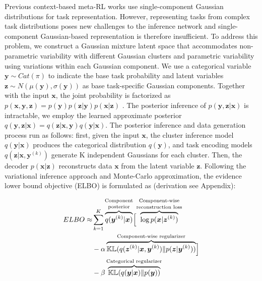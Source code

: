 \documentclass[letterpaper]{article} %
\begin{document}
Previous context-based meta-RL works \cite{PEARL, MELD, VariBAD, asTaskInference} use single-component Gaussian distributions for task representation. However, representing tasks from complex task distributions poses new challenges to the inference network and single-component Gaussian-based representation is therefore insufficient. To address this problem, we construct a Gaussian mixture latent space that accommodates non-parametric variability with different Gaussian clusters and parametric variability using variations within each Gaussian component. We use a categorical variable $\bm y \sim Cat(\pi)$ to indicate the base task probability and latent variables $\bm z \sim N(\mu(\bm y), \sigma(\bm y))$ as base task-specific Gaussian components. Together with the input $\bm x$, the joint probability is factorized as $p(\bm x,\bm y,\bm z) = p(\bm y)p(\bm z|\bm y)p(\bm x|\bm z)$ \cite{VaDE, CURL-Rao}. The posterior inference of $p(\bm y, \bm z|\bm x)$ is intractable, we employ the learned approximate posterior $q(\bm y, \bm z|\bm x)=q(\bm z|\bm x, \bm y)q(\bm y| \bm x)$. The posterior inference and data generation process run as follows: first, given the input $\bm x$, the cluster inference model $q(\bm y|\bm x)$ produces the categorical distribution $q(\bm y)$, and task encoding models $q(\bm z|\bm x, \bm y^{(k)})$ generate K independent Gaussians for each cluster. Then, the decoder $p(\bm x|\bm z)$ reconstructs data $\bm x$ from the latent variable $\bm z$. Following the variational inference approach and Monte-Carlo approximation, the evidence lower bound objective (ELBO) is formulated as (derivation see Appendix):

\begin{equation}
\label{con:ELBO}
\begin{aligned}
ELBO \approx  &\sum_{k=1}^{K} \overbrace{q(\bm y^{(k)}|\bm x)}^{\text{\shortstack{Component \\ posterior}}} \Bigl[\overbrace{\log p(\bm x|\bm z^{(k)})}^{\text{\shortstack{Component-wise \\ reconstruction loss}}} \\
&-\alpha\overbrace{\mathbb{KL}(q(\bm z^{(k)}|\bm x, \bm y^{(k)})\| p(\bm z|\bm y^{(k)}))}^{\text{Component-wise regularizer}}\Bigr] \\
&-\beta\overbrace{\mathbb{KL}(q(\bm y|\bm x)\|p(\bm y))}^{\text{Categorical regularizer}}
\end{aligned}
\end{equation}
\end{document}
